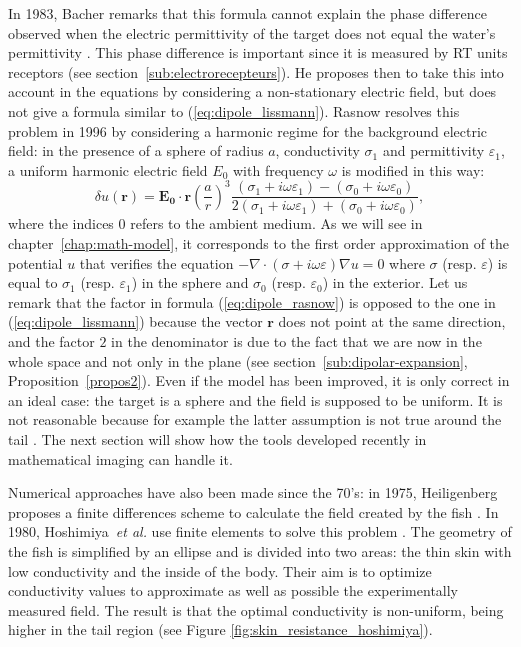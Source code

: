 In 1983, Bacher remarks that this formula cannot explain the phase
difference observed when the electric permittivity of the target does
not equal the water's permittivity \cite{bacher1983}. This phase
difference is important since it is measured by RT units receptors
(see section~\ref{sub:electrorecepteurs}). He proposes then to take
this into account in the equations by considering a non-stationary
electric field, but does not give a formula similar to (\ref{eq:dipole_lissmann}).
Rasnow resolves this problem in 1996 by considering a harmonic regime
for the background electric field: in the presence of a sphere of
radius $a$, conductivity $\sigma_{1}$ and permittivity $\varepsilon_{1}$,
a uniform harmonic electric field $E_{0}$ with frequency $\omega$
is modified in this way:
\begin{equation}
\delta u(\boldsymbol{r})=\boldsymbol{E_{0}}\cdot\boldsymbol{r}\left(\frac{a}{r}\right)^{3}\frac{\left(\sigma_{1}+i\omega\varepsilon_{1}\right)-\left(\sigma_{0}+i\omega\varepsilon_{0}\right)}{2\left(\sigma_{1}+i\omega\varepsilon_{1}\right)+\left(\sigma_{0}+i\omega\varepsilon_{0}\right)},
\label{eq:dipole_rasnow}
\end{equation}
 where the indices $0$ refers to the ambient medium. As we will see
in chapter~\ref{chap:math-model},
it corresponds to the first order approximation of the potential $u$
that verifies the equation $-\nabla\cdot(\sigma+i\omega\varepsilon)\nabla u=0$
where $\sigma$ (resp. $\varepsilon$) is equal to $\sigma_{1}$ (resp.
$\varepsilon_{1}$) in the sphere and $\sigma_{0}$ (resp. $\varepsilon_{0}$)
in the exterior. Let us remark that the factor in formula (\ref{eq:dipole_rasnow})
is opposed to the one in (\ref{eq:dipole_lissmann}) because the vector
$\boldsymbol{r}$ does not point at the same direction, and the factor
$2$ in the denominator is due to the fact that we are now in the
whole space and not only in the plane (see section~\ref{sub:dipolar-expansion},
Proposition~\ref{propos2}). Even if the model
has been improved, it is only correct in an ideal case: the target
is a sphere and the field is supposed to be uniform. It is not reasonable
because for example the latter assumption is not true around the tail
\cite{assad1998electric,assad1999electric}. The next section will
show how the tools developed recently in mathematical imaging can
handle it.

Numerical approaches have also been made since the 70's: in 1975,
Heiligenberg proposes a finite differences scheme to calculate the
field created by the fish \cite{heiligenberg1975theoretical}. In
1980, Hoshimiya~\emph{et al.} use finite elements to solve this problem
\cite{hoshimiya1980theapteronotus}. The geometry of the fish is simplified
by an ellipse and is divided into two areas: the thin skin with low
conductivity and the inside of the body. Their aim is to optimize
conductivity values to approximate as well as possible the experimentally
measured field. The result is that the optimal conductivity is non-uniform,
being higher in the tail region (see Figure \ref{fig:skin_resistance_hoshimiya}).

